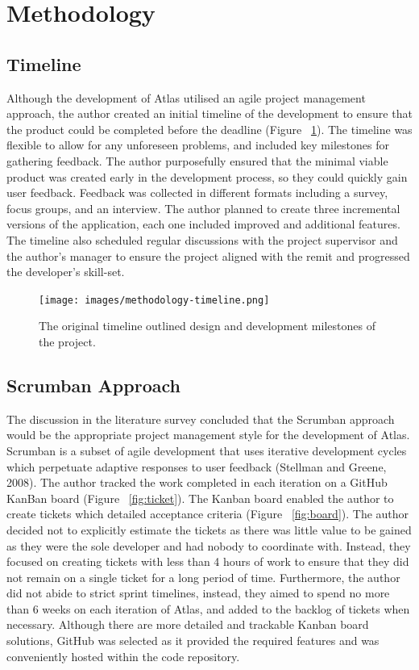 \documentclass{article}
\begin{document}
\newpage

\section{Methodology}

\subsection{Timeline}

Although the development of Atlas utilised an agile project management approach, the author created an initial timeline of the development to ensure that the product could be completed before the deadline (Figure ~\ref{fig:timeline}). The timeline was flexible to allow for any unforeseen problems, and included key milestones for gathering feedback. The author purposefully ensured that the minimal viable product was created early in the development process, so they could quickly gain user feedback. Feedback was collected in different formats including a survey, focus groups, and an interview. The author planned to create three incremental versions of the application, each one included improved and additional features. The timeline also scheduled regular discussions with the project supervisor and the author's manager to ensure the project aligned with the remit and progressed the developer's skill-set.

\begin{figure}[!h]
  \centering
      \texttt{[image: images/methodology-timeline.png]}
  \caption{The original timeline outlined design and development milestones of the project.}
  \label{fig:timeline}
\end{figure}

\subsection{Scrumban Approach}

The discussion in the literature survey concluded that the Scrumban approach would be the appropriate project management style for the development of Atlas. Scrumban is a subset of agile development that uses iterative development cycles which perpetuate adaptive responses to user feedback (Stellman and Greene, 2008). The author tracked the work completed in each iteration on a GitHub KanBan board (Figure ~\ref{fig:ticket}). The Kanban board enabled the author to create tickets which detailed acceptance criteria (Figure ~\ref{fig:board}). The author decided not to explicitly estimate the tickets as there was little value to be gained as they were the sole developer and had nobody to coordinate with. Instead, they focused on creating tickets with less than 4 hours of work to ensure that they did not remain on a single ticket for a long period of time. Furthermore, the author did not abide to strict sprint timelines, instead, they aimed to spend no more than 6 weeks on each iteration of  Atlas, and added to the backlog of tickets when necessary. Although there are more detailed and trackable Kanban board solutions, GitHub was selected as it provided the required features and was conveniently hosted within the code repository. 
\end{document}
